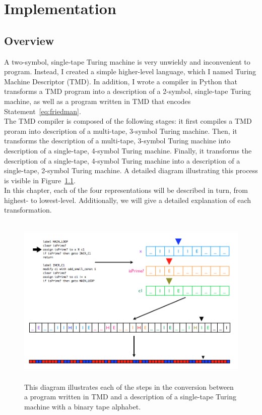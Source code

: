 \documentclass[11pt]{report}
\begin{document}

\chapter{Implementation \label{sec:implementation}}

\section{Overview}

A two-symbol, single-tape Turing machine is very unwieldy and inconvenient to program. Instead, I created a simple higher-level language, which I named Turing Machine Descriptor (TMD). In addition, I wrote a compiler in Python that transforms a TMD program into a description of a 2-symbol, single-tape Turing machine, as well as a program written in TMD that encodes Statement~\ref{eq:friedman}. \\
 
The TMD compiler is composed of the following stages: it first compiles a TMD proram into description of a multi-tape, 3-symbol Turing machine. Then, it transforms the description of a multi-tape, 3-symbol Turing machine into description of a single-tape, 4-symbol Turing machine. Finally, it transforms the description of a single-tape, 4-symbol Turing machine into a description of a single-tape, 2-symbol Turing machine. A detailed diagram illustrating this process is visible in Figure~\ref{fig:process}. \\

In this chapter, each of the four representations will be described in turn, from highest- to lowest-level. Additionally, we will give a detailed explanation of each transformation. \\

\begin{figure} 
\begin{center} 
\includegraphics[height=3.25in,width=5in,angle=0]{figs/process.png} 
\caption{This diagram illustrates each of the steps in the conversion between a program written in TMD and a description of a single-tape Turing machine with a binary tape alphabet.\label{fig:process}} 
\end{center} 
\end{figure}  
\end{document}
